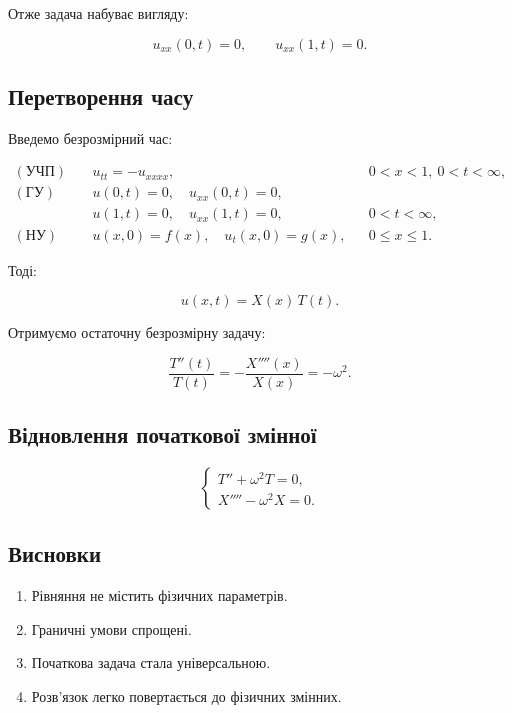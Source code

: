 \documentclass[
  ukrainian,
]{article}
\providecommand{\tightlist}{%
  \setlength{\itemsep}{0pt}\setlength{\parskip}{0pt}}
\begin{document}
Отже задача набуває вигляду:

\[
u_{xx}(0, t) = 0, \qquad u_{xx}(1, t) = 0.
\]

\subsection{Перетворення
часу}\label{ux43fux435ux440ux435ux442ux432ux43eux440ux435ux43dux43dux44f-ux447ux430ux441ux443}

Введемо безрозмірний час:

\[
\begin{aligned}
(\text{УЧП})\quad & u_{tt} = -u_{xxxx}, && 0 < x < 1,\ 0 < t < \infty, \\
(\text{ГУ})\quad & u(0,t) = 0,\quad u_{xx}(0,t) = 0, \\
& u(1,t) = 0,\quad u_{xx}(1,t) = 0, && 0 < t < \infty, \\
(\text{НУ})\quad & u(x,0) = f(x), \quad u_t(x,0) = g(x), && 0 \leqslant x \leqslant 1.
\end{aligned}
\]

Тоді:

\[
u(x,t) = X(x)\,T(t).
\]

Отримуємо остаточну безрозмірну задачу:

\[
\frac{T''(t)}{T(t)} = -\frac{X''''(x)}{X(x)} = -\omega^2.
\]

\subsection{Відновлення початкової
змінної}\label{ux432ux456ux434ux43dux43eux432ux43bux435ux43dux43dux44f-ux43fux43eux447ux430ux442ux43aux43eux432ux43eux457-ux437ux43cux456ux43dux43dux43eux457}

\[
\begin{cases}
T'' + \omega^2 T = 0, \\
X'''' - \omega^2 X = 0.
\end{cases}
\]

\subsection{Висновки}\label{ux432ux438ux441ux43dux43eux432ux43aux438}

\begin{enumerate}
\def\labelenumi{\arabic{enumi}.}
\tightlist
\item
  Рівняння не містить фізичних параметрів.
\item
  Граничні умови спрощені.
\item
  Початкова задача стала універсальною.
\item
  Розв'язок легко повертається до фізичних змінних.
\end{enumerate}
\end{document}
